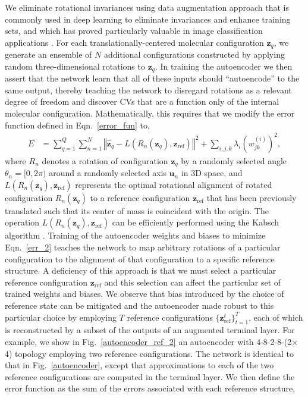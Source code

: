 \documentclass[12pt]{article}
\newcommand*{\blauw}[1]{#1}
\newcommand*{\blauwr}[1]{#1}
\begin{document}
We eliminate rotational invariances using data augmentation approach that is commonly used in deep learning to eliminate invariances and enhance training sets, and which has proved particularly valuable in image classification applications \cite{krizhevsky2012imagenet}. For each translationally-centered molecular configuration $\mathbf{z}_q$, we generate an ensemble of $N$ additional configurations constructed by applying random three-dimensional rotations to $\mathbf{z}_q$. In training the autoencoder we then assert that the network learn that all of these inputs should ``autoencode'' to the same output, thereby teaching the network to disregard rotations as a relevant degree of freedom and discover CVs that are a function only of the internal molecular configuration. Mathematically, this requires that we modify the error function defined in \blauw{Eqn.~\ref{error_fun}} to,
\begin{align}\label{err_2}
E &= \sum_{q=1}^Q \sum_{n=1}^N \left\Vert \hat{\mathbf{z}}_q - L \left( R_n \left( \mathbf{z}_q \right) ,  \mathbf{z}_\mathrm{ref} \right) \right\Vert^2 + \sum_{i,j,k} \lambda_i \left( w_{jk}^{(i)} \right)^2,
\end{align}
\blauwr{where $R_n$ denotes a rotation of configuration $\mathbf{z}_q$ by a randomly selected angle $\theta_n = [0,2\pi)$ around a randomly selected axis $\mathbf{u}_n$ in 3D space, and $L \left( R_n \left( \mathbf{z}_q \right),  \mathbf{z}_\mathrm{ref} \right)$ represents the optimal rotational alignment of rotated configuration $R_n \left( \mathbf{z}_q \right)$ to a reference configuration $\mathbf{z}_\mathrm{ref}$ that has been previously translated such that its center of mass is coincident with the origin. The operation $L \left( R_n \left( \mathbf{z}_q \right),  \mathbf{z}_\mathrm{ref} \right)$ can be efficiently performed using the Kabsch algorithm \cite{kabsch1976solution}.} Training of the autoencoder weights and biases to minimize \blauw{Eqn.~\ref{err_2}} teaches the network to map arbitrary rotations of a particular configuration to the alignment of that configuration to a specific reference structure. A deficiency of this approach is that we must select a particular reference configuration $\mathbf{z}_\mathrm{ref}$ and this selection can affect the particular set of trained weights and biases. We observe that bias introduced by the choice of reference state can be mitigated and the autoencoder made robust to this particular choice by employing $T$ reference configurations $\{ \mathbf{z}_\mathrm{ref}^t \}_{t=1}^T$, each of which is reconstructed by a subset of the outputs of an augmented terminal layer. For example, we show in \blauw{Fig.~\ref{autoencoder_ref_2}} an autoencoder with 4-8-2-8-(2$\times$4) topology employing two reference configurations. The network is identical to that in \blauw{Fig.~\ref{autoencoder}}, except that approximations to each of the two reference configurations are computed in the terminal layer. We then define the error function as the sum of the errors associated with each reference structure,
\end{document}
